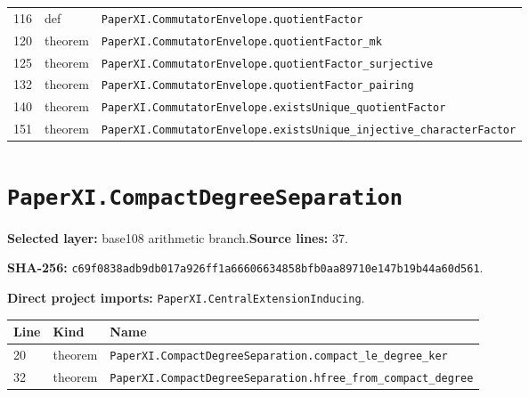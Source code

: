 \documentclass[10pt,oneside]{book}
\begin{document}
\begin{longtable}{@{}p{}p{}p{}@{}}
116&def&\nolinkurl{PaperXI.CommutatorEnvelope.quotientFactor}\\

120&theorem&\nolinkurl{PaperXI.CommutatorEnvelope.quotientFactor_mk}\\

125&theorem&\nolinkurl{PaperXI.CommutatorEnvelope.quotientFactor_surjective}\\

132&theorem&\nolinkurl{PaperXI.CommutatorEnvelope.quotientFactor_pairing}\\

140&theorem&\nolinkurl{PaperXI.CommutatorEnvelope.existsUnique_quotientFactor}\\

151&theorem&\nolinkurl{PaperXI.CommutatorEnvelope.existsUnique_injective_characterFactor}\\

\bottomrule\end{longtable}

\section{\texorpdfstring{\nolinkurl{PaperXI.CompactDegreeSeparation}}{PaperXI.CompactDegreeSeparation}}\label{module:PaperXI.CompactDegreeSeparation}

\textbf{Selected layer:} base108 arithmetic branch.\quad\textbf{Source lines:} 37.\par\textbf{SHA-256:} {\scriptsize\nolinkurl{c69f0838adb9db017a926ff1a66606634858bfb0aa89710e147b19b44a60d561}}.


\textbf{Direct project imports:} \nolinkurl{PaperXI.CentralExtensionInducing}.

\begin{longtable}{@{}p{}p{}p{}@{}}\toprule Line&Kind&Name\\\midrule\endhead

20&theorem&\nolinkurl{PaperXI.CompactDegreeSeparation.compact_le_degree_ker}\\

32&theorem&\nolinkurl{PaperXI.CompactDegreeSeparation.hfree_from_compact_degree}\\

\bottomrule\end{longtable}
\end{document}
